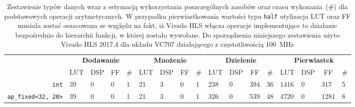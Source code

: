 \begin{landscape}
\phantom{\rule{1em}{6em}}
\begin{table}[H]
\centering
\caption[Zestawienie typów danych wraz z estymacją wykorzystania poszczególnych zasobów oraz czasu wykonania dla podstawowych operacji arytmetycznych]{Zestawienie typów danych wraz z estymacją wykorzystania poszczególnych zasobów oraz czasu wykonania~(\#) dla podstawowych operacji arytmetycznych. W przypadku pierwiastkowania wartości typu \texttt{half} utylizacja LUT oraz FF musiała zostać oszacowana ze względu na fakt, iż Vivado HLS włącza operacje implementujące to działanie bezpośrednio do hierarchii funkcji, w której zostało wywołane. Do sporządzenia niniejszego zestawienia użyto Vivado HLS 2017.4 dla układu VC707 działającego z częstotliwością 100~MHz}
\label{ch3:tab:op_type_util_time}
\begin{tabular}{|r|l|l|l|l||l|l|l|l||l|l|l|l||l|l|l|l|}
\hline
\multicolumn{1}{|l|}{\multirow{2}{*}{}}           & \multicolumn{4}{c||}{\textbf{Dodawanie}}                                                                       & \multicolumn{4}{c||}{\textbf{Mnożenie}}                                                                       & \multicolumn{4}{c||}{\textbf{Dzielenie}}                                                                      & \multicolumn{4}{c|}{\textbf{Pierwiastek}}                                                                    \\ \cline{2-17} 
\multicolumn{1}{|l|}{}                            & \multicolumn{1}{c|}{LUT} & \multicolumn{1}{c|}{DSP} & \multicolumn{1}{c|}{FF} & \multicolumn{1}{c||}{\#} & \multicolumn{1}{c|}{LUT} & \multicolumn{1}{c|}{DSP} & \multicolumn{1}{c|}{FF} & \multicolumn{1}{c||}{\#} & \multicolumn{1}{c|}{LUT} & \multicolumn{1}{c|}{DSP} & \multicolumn{1}{c|}{FF} & \multicolumn{1}{c||}{\#} & \multicolumn{1}{c|}{LUT} & \multicolumn{1}{c|}{DSP} & \multicolumn{1}{c|}{FF} & \multicolumn{1}{c|}{\#} \\ \hline
\texttt{int}                                      & 39                       & 0                        & 0                       & 1                             & 21                       & 3                        & 0                       & 1                            & 238                      & 0                        & 394                     & 36                           & 1416                     & 0                        & 317                     & 5                            \\ \hline
\texttt{ap\_fixed\textless{}32, 20\textgreater{}} & 39                       & 0                        & 0                       & 1                             & 21                       & 3                        & 0                       & 1                            & 326                      & 0                        & 539                     & 48                           & 4720                     & 0                        & 1281                    & 8                            \\ \hline

\end{tabular}
\end{table}
\end{landscape}
